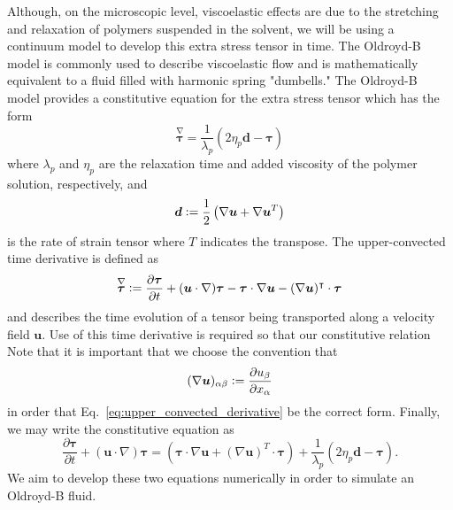 Although, on the microscopic level, viscoelastic effects are due to the stretching and relaxation of polymers suspended in the solvent, we will be using a continuum model to develop this extra stress tensor in time. The Oldroyd-B model is commonly used to describe viscoelastic flow and is mathematically equivalent to a fluid filled with harmonic spring "dumbells." The Oldroyd-B model provides a constitutive equation for the extra stress tensor which has the form
\begin{equation}\label{eq:short_oldroyd_b}
\overset{\nabla}{\bm{\tau}} = \frac{1}{\lambda_p}\left(2\eta_p\bm{d}- \bm{\tau}\right)
\end{equation}
where $\lambda_p$ and $\eta_p$ are the relaxation time and added viscosity of the polymer solution, respectively, and  
\begin{equation}\label{eq:rate_of_strain}
\bm{d} \vcentcolon= \frac{1}{2}\left(\nabla\bm{u} + \nabla \bm{u}^T\right)
\end{equation}
is the rate of strain tensor where $T$ indicates the transpose. The upper-convected time derivative is defined as
\begin{equation}\label{eq:upper_convected_derivative}
\overset{\nabla}{\bm{\tau}} \vcentcolon= \frac{\partial \bm{\tau}}{\partial t} + (\bm{u} \cdot \nabla)\bm{\tau} - \bm{\tau} \cdot \nabla\bm{u} -(\nabla\bm{u})^\intercal \cdot \bm{\tau}
\end{equation}
and describes the time evolution of a tensor being transported along a velocity field $\bm{u}$. Use of this time derivative is required so that our constitutive relation Note that it is important that we choose the convention that
\begin{equation}\label{eq:gradient_convention}
(\nabla \bm{u})_{\alpha\beta} \vcentcolon= \frac{\partial u_{\beta}}{\partial x_\alpha}
\end{equation}
in order that Eq.~\eqref{eq:upper_convected_derivative} be the correct form. Finally, we may write the constitutive equation as
\begin{equation}\label{eq:full_oldroyd_b}
\frac{\partial \bm{\tau}}{\partial t} + (\bm{u} \cdot \nabla)\bm{\tau}= \left(\bm{\tau} \cdot \nabla\bm{u} +(\nabla\bm{u})^T \cdot \bm{\tau}\right) + \frac{1}{\lambda_p}\left(2\eta_p \bm{d} - \bm{\tau}\right).
\end{equation}
We aim to develop these two equations numerically in order to simulate an Oldroyd-B fluid.